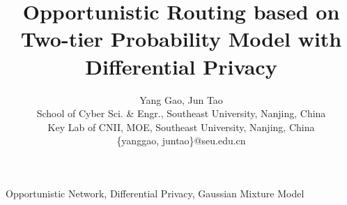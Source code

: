 \documentclass[10pt,conference]{IEEEtran}
\begin{document}
\title{
Opportunistic Routing based on Two-tier Probability Model
with Differential Privacy
}

\author{Yang Gao, Jun Tao\\
        School of Cyber Sci. \& Engr., Southeast University, Nanjing, China\\
        Key Lab of CNII, MOE, Southeast University, Nanjing, China\\
        \{yanggao, juntao\}@seu.edu.cn
        }

\maketitle



\begin{IEEEkeywords}
Opportunistic Network, Differential Privacy, Gaussian Mixture Model
\end{IEEEkeywords}

\IEEEpeerreviewmaketitle











\end{document}
